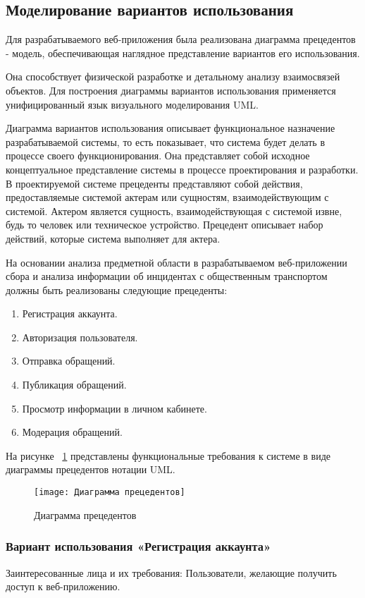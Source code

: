 \subsection{Моделирование вариантов использования}

Для разрабатываемого веб-приложения была реализована диаграмма прецедентов - модель, обеспечивающая наглядное представление вариантов его использования. 

Она способствует физической разработке и детальному анализу взаимосвязей объектов. Для построения диаграммы вариантов использования применяется унифицированный язык визуального моделирования UML. 

Диаграмма вариантов использования описывает функциональное назначение разрабатываемой системы, то есть показывает, что система будет делать в процессе своего функционирования. Она представляет собой исходное концептуальное представление системы в процессе проектирования и разработки. В проектируемой системе прецеденты представляют собой действия, предоставляемые системой актерам или сущностям, взаимодействующим с системой. Актером является сущность, взаимодействующая с системой извне, будь то человек или техническое устройство. Прецедент описывает набор действий, которые система выполняет для актера.

На основании анализа предметной области в разрабатываемом веб-приложении сбора и анализа информации об инцидентах с общественным транспортом должны быть реализованы следующие прецеденты:
\begin{enumerate}
\item Регистрация аккаунта.
\item Авторизация пользователя.
\item Отправка обращений.
\item Публикация обращений.
\item Просмотр информации в личном кабинете.
\item Модерация обращений.
\end{enumerate}

На рисунке ~\ref{templ:image0} представлены функциональные требования к системе в виде диаграммы прецедентов нотации UML.
\begin{figure}[H]
	\texttt{[image: Диаграмма прецедентов]}
	\caption{Диаграмма прецедентов}
	\label{templ:image0}
\end{figure}

\subsubsection {Вариант использования «Регистрация аккаунта»}
Заинтересованные лица и их требования: Пользователи, желающие получить доступ к веб-приложению.

